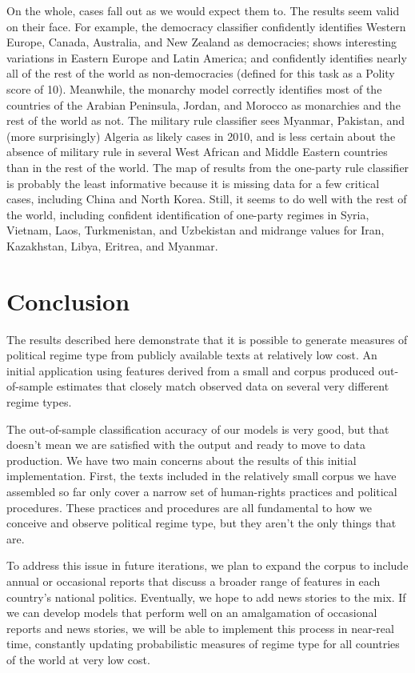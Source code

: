 \documentclass[pdftex,12pt,fullpage,oneside]{amsart}
\begin{document}
On the whole, cases fall out as we would expect them to. The results seem valid on their face. For example, the democracy classifier confidently identifies Western Europe, Canada, Australia, and New Zealand as democracies; shows interesting variations in Eastern Europe and Latin America; and confidently identifies nearly all of the rest of the world as non-democracies (defined for this task as a Polity score of 10). Meanwhile, the monarchy model correctly identifies most of the countries of the Arabian Peninsula, Jordan, and Morocco as monarchies and the rest of the world as not. The military rule classifier sees Myanmar, Pakistan, and (more surprisingly) Algeria as likely cases in 2010, and is less certain about the absence of military rule in several West African and Middle Eastern countries than in the rest of the world. The map of results from the one-party rule classifier is probably the least informative because it is missing data for a few critical cases, including China and North Korea. Still, it seems to do well with the rest of the world, including confident identification of one-party regimes in Syria, Vietnam, Laos, Turkmenistan, and Uzbekistan and midrange values for Iran, Kazakhstan, Libya, Eritrea, and Myanmar.

\section{Conclusion}

The results described here demonstrate that it is possible to generate measures of political regime type from publicly available texts at relatively low cost. An initial application using features derived from a small and corpus produced out-of-sample estimates that closely match observed data on several very different regime types.

The out-of-sample classification accuracy of our models is very good, but that doesn't mean we are satisfied with the output and ready to move to data production. We have two main concerns about the results of this initial implementation. First, the texts included in the relatively small corpus we have assembled so far only cover a narrow set of human-rights practices and political procedures. These practices and procedures are all fundamental to how we conceive and observe political regime type, but they aren't the only things that are.

To address this issue in future iterations, we plan to expand the corpus to include annual or occasional reports that discuss a broader range of features in each country's national politics. Eventually, we hope to add news stories to the mix. If we can develop models that perform well on an amalgamation of occasional reports and news stories, we will be able to implement this process in near-real time, constantly updating probabilistic measures of regime type for all countries of the world at very low cost.
\end{document}
